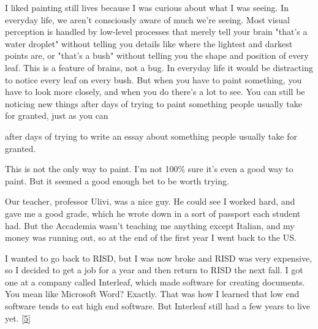 I liked painting still lives because I was
                  curious about what I was seeing. In everyday life, we aren't
                  consciously aware of much we're seeing. Most visual perception
                  is handled by low-level processes that merely tell your brain
                  "that's a water droplet" without telling you details like
                  where the lightest and darkest points are, or "that's a bush"
                  without telling you the shape and position of every leaf. This
                  is a feature of brains, not a bug. In everyday life it would
                  be distracting to notice every leaf on every bush. But when
                  you have to paint something, you have to look more closely,
                  and when you do there's a lot to see. You can still be
                  noticing new things after days of trying to paint something
                  people usually take for granted, just as you can
                  
                  after days of trying to write an essay about something people
                  usually take for granted.

This is not the only way
                  to paint. I'm not 100\% sure it's even a good way to paint. But
                  it seemed a good enough bet to be worth trying.

Our
                  teacher, professor Ulivi, was a nice guy. He could see I
                  worked hard, and gave me a good grade, which he wrote down in
                  a sort of passport each student had. But the Accademia wasn't
                  teaching me anything except Italian, and my money was running
                  out, so at the end of the first year I went back to the US.

I
                  wanted to go back to RISD, but I was now broke and RISD was
                  very expensive, so I decided to get a job for a year and then
                  return to RISD the next fall. I got one at a company called
                  Interleaf, which made software for creating documents. You
                  mean like Microsoft Word? Exactly. That was how I learned that
                  low end software tends to eat high end software. But Interleaf
                  still had a few years to live yet.
                  [\href{\#f5n}{5}]

